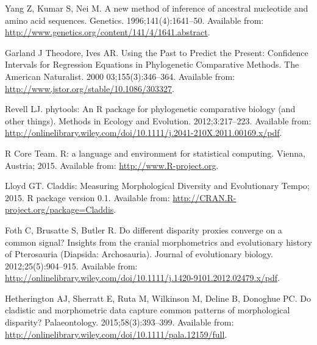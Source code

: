 \documentclass[12pt,letterpaper]{article}
\begin{document}
\begin{thebibliography}{10}

Yang Z, Kumar S, Nei M.
\newblock A new method of inference of ancestral nucleotide and amino acid
  sequences.
\newblock Genetics. 1996;141(4):1641--50.
\newblock Available from:
  \url{http://www.genetics.org/content/141/4/1641.abstract}.

Garland J Theodore, Ives AR.
\newblock Using the Past to Predict the Present: Confidence Intervals for
  Regression Equations in Phylogenetic Comparative Methods.
\newblock The {A}merican Naturalist. 2000 03;155(3):346--364.
\newblock Available from: \url{http://www.jstor.org/stable/10.1086/303327}.

Revell LJ.
\newblock phytools: An {R} package for phylogenetic comparative biology (and
  other things).
\newblock Methods in Ecology and Evolution. 2012;3:217--223.
\newblock Available from:
  \url{http://onlinelibrary.wiley.com/doi/10.1111/j.2041-210X.2011.00169.x/pdf}.

{R Core Team}. R: a language and environment for statistical computing. Vienna,
  Austria; 2015.
\newblock Available from: \url{http://www.R-project.org}.

Lloyd GT. Claddis: Measuring Morphological Diversity and Evolutionary Tempo;
  2015.
\newblock R package version 0.1.
\newblock Available from: \url{http://CRAN.R-project.org/package=Claddis}.

Foth C, Brusatte S, Butler R.
\newblock Do different disparity proxies converge on a common signal? Insights
  from the cranial morphometrics and evolutionary history of {P}terosauria
  ({D}iapsida: {A}rchosauria).
\newblock Journal of evolutionary biology. 2012;25(5):904--915.
\newblock Available from:
  \url{http://onlinelibrary.wiley.com/doi/10.1111/j.1420-9101.2012.02479.x/pdf}.

Hetherington AJ, Sherratt E, Ruta M, Wilkinson M, Deline B, Donoghue PC.
\newblock Do cladistic and morphometric data capture common patterns of
  morphological disparity?
\newblock Palaeontology. 2015;58(3):393--399.
\newblock Available from:
  \url{http://onlinelibrary.wiley.com/doi/10.1111/pala.12159/full}.


\end{thebibliography}
\end{document}
